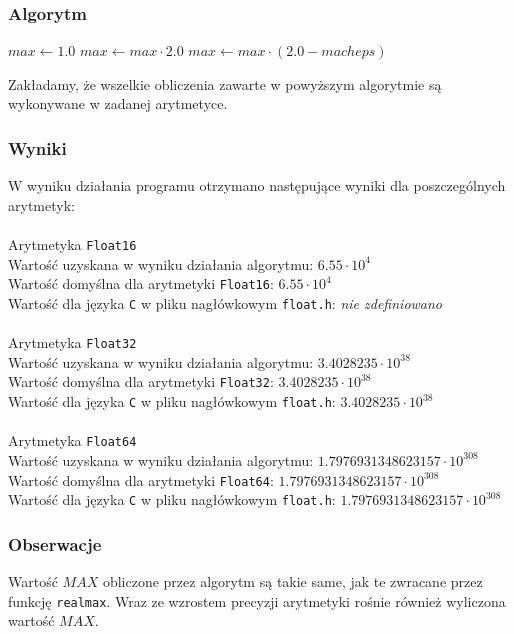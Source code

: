 \documentclass{article}
\begin{document}
\subsubsection{Algorytm}
\begin{algorithm}
\begin{algorithmic}[1]
        \State $max \gets 1.0$
            \State $max \gets max \cdot 2.0$
        \EndWhile
        \State $max \gets max \cdot(2.0 - macheps)$
        \State {}
    \EndFunction
\end{algorithmic}    
\end{algorithm}
Zakładamy, że wszelkie obliczenia zawarte w powyższym algorytmie są wykonywane w zadanej arytmetyce.

\subsubsection{Wyniki}
W wyniku działania programu otrzymano następujące wyniki dla poszczególnych arytmetyk: \\\\
Arytmetyka \texttt{Float16} \\
Wartość uzyskana w wyniku działania algorytmu: $6.55 \cdot 10^{4}$ \\
Wartość domyślna dla arytmetyki \texttt{Float16}: $6.55 \cdot 10^{4}$ \\
Wartość dla języka \texttt{C} w pliku nagłówkowym \texttt{float.h}: \textit{nie zdefiniowano} \\\\
Arytmetyka \texttt{Float32} \\
Wartość uzyskana w wyniku działania algorytmu: $3.4028235 \cdot 10^{38}$ \\
Wartość domyślna dla arytmetyki \texttt{Float32}: $3.4028235 \cdot 10^{38}$ \\
Wartość dla języka \texttt{C} w pliku nagłówkowym \texttt{float.h}: $3.4028235 \cdot 10^{38}$ \\\\
Arytmetyka \texttt{Float64} \\
Wartość uzyskana w wyniku działania algorytmu: $1.7976931348623157 \cdot 10^{308}$ \\
Wartość domyślna dla arytmetyki \texttt{Float64}: $1.7976931348623157 \cdot 10^{308}$ \\
Wartość dla języka \texttt{C} w pliku nagłówkowym \texttt{float.h}: $1.7976931348623157 \cdot 10^{308}$ 
\subsubsection{Obserwacje}
Wartość $MAX$ obliczone przez algorytm są takie same, jak te zwracane przez funkcję \texttt{realmax}. Wraz ze wzrostem precyzji arytmetyki rośnie również wyliczona wartość $MAX$.
\end{document}
